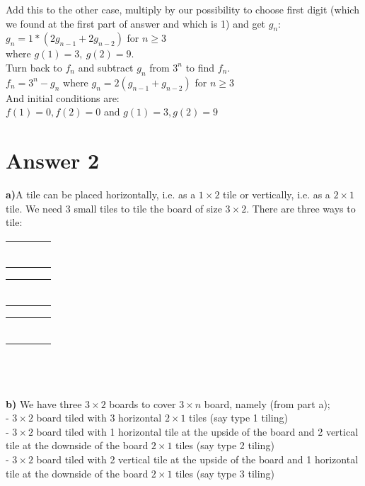 \documentclass[12pt]{article}
\begin{document}
Add this to the other case, multiply by our possibility to choose first digit (which we found at the first part of answer and which is 1) and get $g_n$:\\
$g_n = 1*(2g_{n-1} + 2g_{n-2})$ for $n \geq 3$\\
where $g(1) = 3,\ g(2) = 9$.\\

Turn back to $f_n$ and subtract $g_n$ from $3^n$ to find $f_n$.\\
$f_n = 3^n - g_n$ where $g_n = 2(g_{n-1} + g_{n-2})$ for $n\geq 3$ \\
And initial conditions are:\\ 
$f(1) = 0 , f(2) = 0$ and $g(1) = 3,g(2) = 9$

\section*{Answer 2}
\textbf{a)}A tile can be placed horizontally, i.e. as a $1 \times 2$ tile or vertically, i.e. as a $2 \times 1$ tile. We need 3 small tiles to tile the board of size $3 \times 2$. There are three ways to tile:\\
\begin{tabular}{|cccc|}
\hline 
 &  &  & \tabularnewline
 &  &  & \tabularnewline
\hline 
\hline 
 &  &  & \tabularnewline
 &  &  & \tabularnewline
\hline 
\hline 
 &  &  & \tabularnewline
 &  &  & \tabularnewline
\hline 
\end{tabular}
\begin{tabular}{|cc|cc|}
  \hline
  & & & \tabularnewline
  & & & \tabularnewline 
  & & & \tabularnewline
  & & & \tabularnewline
  \hline \hline
  & \multicolumn{1}{c}{} &  & \tabularnewline
  & \multicolumn{1}{c}{} &  & \tabularnewline
  \hline
\end{tabular}
\begin{tabular}{|cc|cc|}
\hline 
 & \multicolumn{1}{c}{} &  & \tabularnewline
 & \multicolumn{1}{c}{} &  & \tabularnewline
\hline 
\hline 
 &  &  & \tabularnewline
 &  &  & \tabularnewline
 &  &  & \tabularnewline
 &  &  & \tabularnewline
\hline 
\end{tabular}\\\\\\
\textbf{b)} 
We have three $3\times 2$ boards to cover $3\times n$ board, namely (from part a);\\
- $3\times 2$ board tiled with 3 horizontal $2\times 1$ tiles (say type 1 tiling)\\
- $3\times 2$ board tiled with 1 horizontal tile at the upside of the board and 2 vertical tile at the downside of the board $2\times 1$ tiles (say type 2 tiling)\\
- $3\times 2$ board tiled with 2 vertical tile at the upside of the board and 1 horizontal tile at the downside of the board $2\times 1$ tiles (say type 3 tiling)\\
\end{document}
